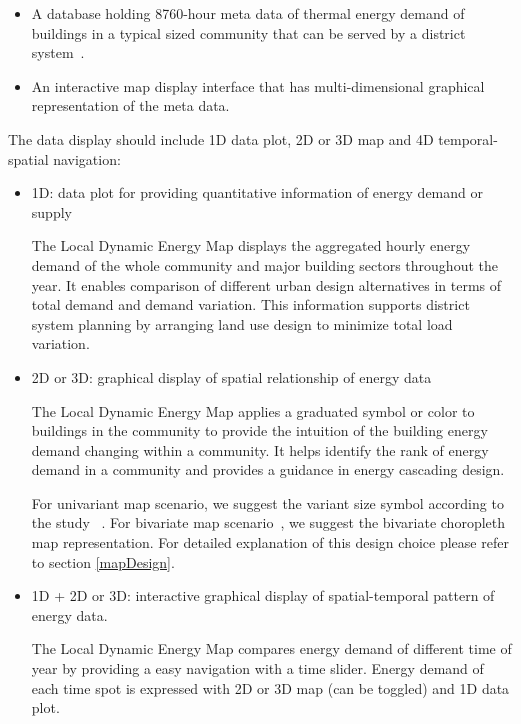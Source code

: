 \documentclass[hidelinks,12pt]{article}
\begin{document}
\begin{itemize}
\item A database holding 8760-hour meta data of thermal energy demand
  of buildings in a typical sized community that can be served by a
  district system~\cite{baird2014}.
\item An interactive map display interface that has multi-dimensional
  graphical representation of the meta data.
\end{itemize}

The data display should include 1D data plot, 2D or 3D map and 4D
temporal-spatial navigation:
\begin{itemize}
\item 1D: data plot for providing quantitative information of energy
  demand or supply

  The Local Dynamic Energy Map displays the aggregated hourly energy
  demand of the whole community and major building sectors throughout
  the year. It enables comparison of different urban design
  alternatives in terms of total demand and demand variation. This
  information supports district system planning by arranging land use
  design to minimize total load variation.

\item 2D or 3D: graphical display of spatial relationship of energy
  data

  The Local Dynamic Energy Map applies a graduated symbol or color to
  buildings in the community to provide the intuition of the building
  energy demand changing within a community. It helps identify the
  rank of energy demand in a community and provides a guidance in
  energy cascading design.
    
  For univariant map scenario, we suggest the variant size symbol
  according to the study ~\cite{Garlandini2009,
    doi:10.1559/1523040639298}. For bivariate map
  scenario~\cite{bimapWiki}, we suggest the bivariate
  choropleth map representation. For detailed explanation of this
  design choice please refer to section \ref{mapDesign}.

\item 1D + 2D or 3D: interactive graphical display of spatial-temporal
  pattern of energy data.
  
  The Local Dynamic Energy Map compares energy demand of different
  time of year by providing a easy navigation with a time
  slider. Energy demand of each time spot is expressed with 2D or 3D
  map (can be toggled) and 1D data plot.
\end{itemize}
\end{document}
